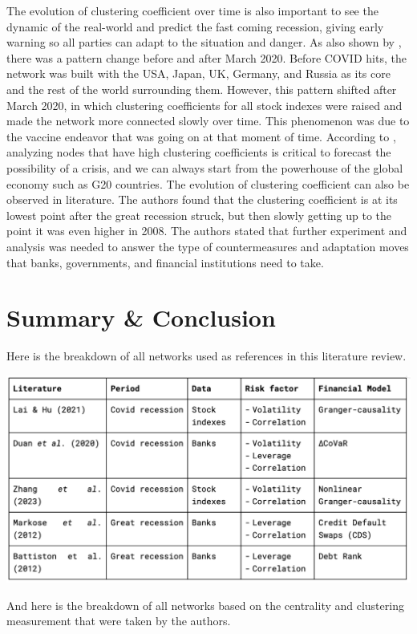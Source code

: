 \documentclass[a4paper,11pt]{article}
\begin{document}
The evolution of clustering coefficient over time is also important to see the dynamic of the real-world and predict the fast coming recession, giving early warning so all parties can adapt to the situation and danger. As also shown by \cite{Lai_Hu_2021}, there was a pattern change before and after March 2020. Before COVID hits, the network was built with the USA, Japan, UK, Germany, and Russia as its core and the rest of the world surrounding them. However, this pattern shifted after March 2020, in which clustering coefficients for all stock indexes were raised and made the network more connected slowly over time. This phenomenon was due to the vaccine endeavor that was going on at that moment of time. According to \cite{Lai_Hu_2021}, analyzing nodes that have high clustering coefficients is critical to forecast the possibility of a crisis, and we can always start from the powerhouse of the global economy such as G20 countries. The evolution of clustering coefficient can also be observed in \cite{Markose_Giansante_Shaghaghi_2012} literature. The authors found that the clustering coefficient is at its lowest point after the great recession struck, but then slowly getting up to the point it was even higher in 2008. The authors stated that further experiment and analysis was needed to answer the type of countermeasures and adaptation moves that banks, governments, and financial institutions need to take.

\section{Summary \& Conclusion}
Here is the breakdown of all networks used as references in this literature review.

\includegraphics[scale=0.5]{comparison_1.png}

And here is the breakdown of all networks based on the centrality and clustering measurement that were taken by the authors.
\end{document}
